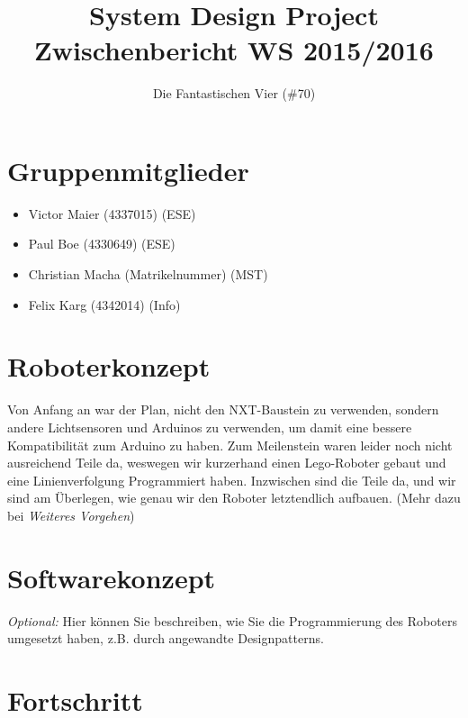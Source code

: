 \documentclass[11pt,a4paper]{article}
\title{
  \Huge System Design Project \\
  \LARGE Zwischenbericht WS 2015/2016
}
\author{
  \Large Die Fantastischen Vier (\#70) \\
}
\begin{document}
\maketitle

\section{Gruppenmitglieder}
\begin{itemize}
  \item Victor Maier (4337015) (ESE)
  \item Paul Boe (4330649) (ESE)
  \item Christian Macha (Matrikelnummer) (MST)
  \item Felix Karg (4342014) (Info)
\end{itemize}

\section{Roboterkonzept}

Von Anfang an war der Plan, nicht den NXT-Baustein zu verwenden, sondern andere Lichtsensoren
und Arduinos zu verwenden, um damit eine bessere Kompatibilität zum Arduino zu haben. Zum Meilenstein waren leider noch nicht ausreichend Teile da, weswegen wir kurzerhand
einen Lego-Roboter gebaut und eine Linienverfolgung Programmiert haben. Inzwischen sind die Teile
da, und wir sind am Überlegen, wie genau wir den Roboter letztendlich aufbauen. 
(Mehr dazu bei \emph{Weiteres Vorgehen})

\section{Softwarekonzept}

\emph{Optional:} Hier können Sie beschreiben, wie Sie die Programmierung des Roboters umgesetzt haben, z.B. durch angewandte Designpatterns.

\section{Fortschritt}
\end{document}
